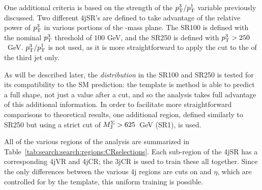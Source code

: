 One additional criteria is based on the strength of the $p_{\text{T}}^3/p_{\text{T}}^1$ variable previously discussed. Two different 4jSR's are defined to take advantage of the relative power of $p_{\text{T}}^3$ in various portions of the \gluino-\lsp mass plane. The SR100 is defined with the nominal $p_{\text{T}}^3$ threshold of $100$ GeV, and the SR250 is defined with $p_{\text{T}}^3 > 250$~GeV. $p_{\text{T}}^3/p_{\text{T}}^1$ is not used, as it is more straightforward to apply the cut to the \pt of the third jet only. 

As will be described later, the \MJ \textit{distribution} in the SR100 and SR250 is tested for its compatibility to the SM prediction: the template is method is able to predict a full shape, not just a value after a cut, and so the analysis takes full advantage of this additional information. In order to facilitate more straightforward comparisons to theoretical results, one additional region, defined similarly to SR250 but using a strict cut of $M_{\textrm{J}}^{\Sigma} > 625$~GeV (SR1), is used. 

All of the various regions of the analysis are summarized in Table~\ref{tab:search:search:regions:CRselections}. Each sub-region of the 4jSR has a corresponding 4jVR and 4jCR; the 3jCR is used to train these all together. Since the only differences between the various 4j regions are cuts on \pt and $\eta$, which are controlled for by the template, this uniform training is possible.

